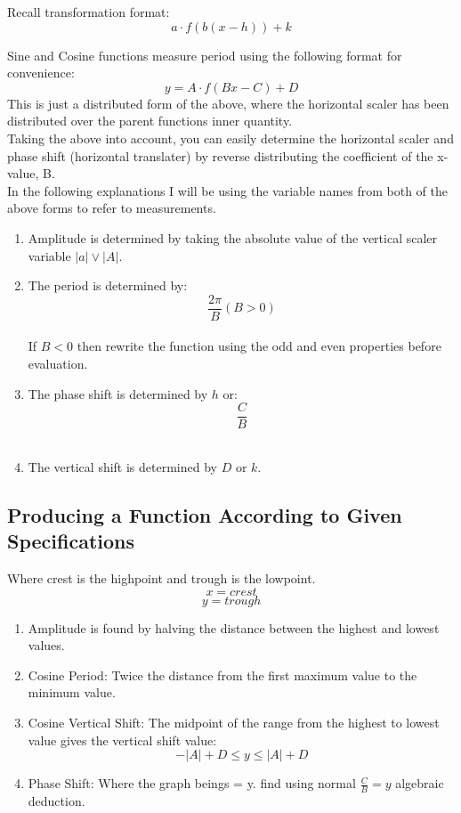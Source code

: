 \documentclass{article}
\begin{document}
Recall transformation format: 
\[a \cdot f(b(x-h))+k\]

Sine and Cosine functions measure period using the following format for
convenience: 
\[y=A \cdot f(Bx-C)+D\]
This is just a distributed form of the above, where the horizontal scaler
has been distributed over the parent functions inner quantity.\\

Taking the above into account, you can easily determine the horizontal
scaler and phase shift (horizontal translater) by reverse distributing
the coefficient of the x-value, B.\\

In the following explanations I will be using the variable names from both
of the above forms to refer to measurements.\\

\begin{enumerate}
\item Amplitude is determined by taking the absolute value of the vertical
  scaler variable $|a| \lor |A|$.\\

\item The period is determined by:
  \[\frac{2\pi}{B} (B > 0)\]\\
  If $B < 0$ then rewrite the function using the odd and even properties
  before evaluation.

\item The phase shift is determined by $h$ or:
  \[\frac{C}{B}\]\\  

\item The vertical shift is determined by $D$ or $k$.\\

\end{enumerate}

\subsection{Producing a Function According to Given Specifications}
Where crest is the highpoint and trough is the lowpoint.
\[x = crest\]
\[y = trough\]
\begin{enumerate}
\item Amplitude is found by halving the distance between the highest and
lowest values.

\item Cosine Period:
Twice the distance from the first maximum value to the minimum value.

\item Cosine Vertical Shift:
The midpoint of the range from the highest to lowest value gives the vertical shift value:
\[-|A|+D\leq y \leq |A|+D\]

\item Phase Shift:
  Where the graph beings = y.
  find using normal $\frac{C}{B}=y$ algebraic deduction.

\end{enumerate}
\end{document}
